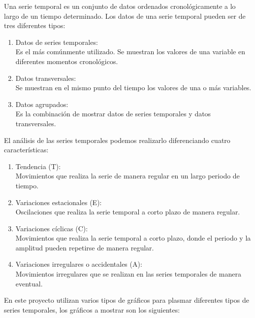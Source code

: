 Una serie temporal \cite{serieTemporal}es un conjunto de datos ordenados cronológicamente a lo largo de un tiempo determinado. 
Los datos de una serie temporal pueden ser de tres diferentes tipos:
\begin{enumerate}
    \item Datos de series temporales:\\
    Es el más comúnmente utilizado. Se muestran los valores de una variable en diferentes momentos cronológicos.
    \item Datos transversales:\\
    Se muestran en el mismo punto del tiempo los valores de una o más variables.
    \item Datos agrupados:\\
    Es la combinación de mostrar datos de series temporales y datos transversales.
\end{enumerate}
El análisis de las series temporales podemos realizarlo diferenciando cuatro características:
\begin{enumerate}
    \item Tendencia (T):\\
    Movimientos que realiza la serie de manera regular en un largo periodo de tiempo.
    \item Variaciones estacionales (E): \\
    Oscilaciones que realiza la serie temporal a corto plazo de manera regular.
    \item Variaciones cíclicas (C):\\
    Movimientos que realiza la serie temporal a corto plazo, donde el periodo y la amplitud pueden repetirse de manera regular.
    \item Variaciones irregulares o accidentales (A):\\
    Movimientos irregulares que se realizan en las series temporales de manera eventual.
\end{enumerate}
En este proyecto utilizan varios tipos de gráficos para plasmar diferentes tipos de series temporales, los gráficos a mostrar son los siguientes:
